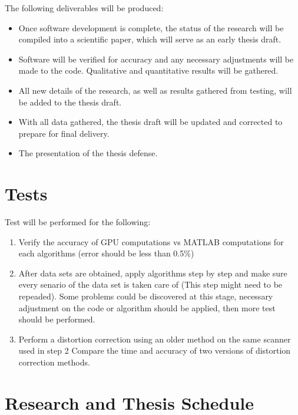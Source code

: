 \documentclass{sbthesis}
\begin{document}
The following deliverables will be produced:

\begin{itemize}
  \item Once software development is complete, the status of the research will be compiled into a scientific paper, which will serve as an early thesis draft.
  \item Software will be verified for accuracy and any necessary adjustments will be made to the code. Qualitative and quantitative results will be gathered.
  \item All new details of the research, as well as results gathered from testing, will be added to the thesis draft.
  \item With all data gathered, the thesis draft will be updated and corrected to prepare for final delivery.
  \item The presentation of the thesis defense.

\end{itemize}

\section{Tests}


Test will be performed for the following:

\begin{enumerate}
\item Verify the accuracy of GPU computations vs MATLAB computations for each algorithms (error should be
less than 0.5\%)
\item After data sets are obtained, apply algorithms step by step and make sure every senario of the data
set is taken care of (This step might need to be repeaded). Some problems could be discovered
at this stage, necessary adjustment on the code or algorithm should be applied, then more test should
be performed.
\item Perform a distortion correction using an older method on the same scanner used in step 2 Compare the
time and accuracy of two versions of distortion correction methods.
\end{enumerate}

\section{Research and Thesis Schedule}
\end{document}
